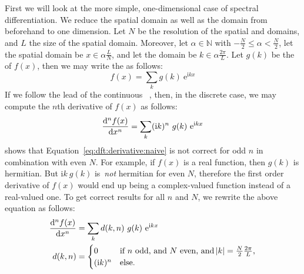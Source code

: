 First we will look at the more simple, one-dimensional case of spectral
differentiation. We reduce the spatial domain as well as the \wavevector domain
from beforehand to one dimension. Let $N$ be the resolution of the spatial
and \wavenumber domains, and $L$ the size of the spatial domain. Moreover, let
$\alpha \in \mathbb{N}$ with $-\frac{N}{2} \leq \alpha < \frac{N}{2}$,
let the spatial domain be $x \in \alpha \frac{L}{N}$, and let the \wavenumber
domain be $k \in \alpha \frac{2\pi}{L}$. Let $g(k)$ be the \DiscreteFourierTransform
of $f(x)$, then we may write the \InvDiscreteFourierTransform as follows:
\begin{equation*}
 f(x) = \sum_{k}g(k)~\mathrm{e}^{\mathrm{i}kx}
\end{equation*}
If we follow the
lead of the continuous \FourierTransform~\citep{Trefethen:2000},
then, in the discrete case, we may compute the $n$th derivative of $f(x)$ as follows:
\begin{equation}
\label{eq:dft:derivative:naive}
  \dod[n]{f(x)}{x} = \sum_{k}(\mathrm{i}k)^n~g(k)~\mathrm{e}^{\mathrm{i}kx}
\end{equation}
\citet{Johnson:2011} shows that Equation~\ref{eq:dft:derivative:naive} is not correct for odd $n$ in
combination with even $N$. For example, if $f(x)$ is a real function, then $g(k)$ is hermitian.
But $\mathrm{i}k~g(k)$ is~\emph{not} hermitian for even $N$, therefore the first
order derivative of $f(x)$ would end up being a complex-valued function instead of a real-valued one.
To get correct results for all $n$ and $N$, we rewrite the above equation as follows:
\begin{align}
\label{eq:dft_derivative}
  \dod[n]{f(x)}{x} &= \sum_{k}d(k, n)~g(k)~\mathrm{e}^{\mathrm{i}kx} \\
\label{eq:dft_derivative_correction}
  d(k, n) &= \begin{cases}
                   0 &\text{if $n$ odd, and $N$ even, and $\abs{k}
= \frac{N}{2}\frac{2\pi}{L}$,} \\
                   (\mathrm{i}k)^n &\text{else.}
                   \end{cases}
\end{align}
%
